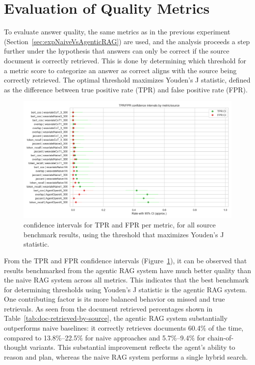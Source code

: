 \section{Evaluation of Quality Metrics}
\label{sec:metric-evaluation-quality}
To evaluate answer quality, the same metrics as in the previous experiment (Section~\ref{sec:expNaiveVsAgenticRAG}) are used, and the analysis proceeds a step further under the hypothesis that answers can only be correct if the source document is correctly retrieved. This is done by determining which threshold for a metric score to categorize an answer as correct aligns with the source being correctly retrieved. The optimal threshold maximizes Youden's J statistic, defined as the difference between true positive rate (TPR) and false positive rate (FPR).
\begin{figure}[H]
    \centering
    \includegraphics[width=1\linewidth]{Figures/06_tpr_fpr_confidence_intervals.png}
    \caption{confidence intervals for TPR and FPR per metric, for all source benchmark results, using the threshold that maximizes Youden's J statistic.}\label{fig:confidence-intervals}
\end{figure}

From the TPR and FPR confidence intervals (Figure~\ref{fig:confidence-intervals}), it can be observed that results benchmarked from the agentic RAG system have much better quality than the naive RAG system across all metrics. This indicates that the best benchmark for determining thresholds using Youden's J statistic is the agentic RAG system. One contributing factor is its more balanced behavior on missed and true retrievals. As seen from the document retrieved percentages shown in Table~\ref{tab:doc-retrieved-by-source}, the agentic RAG system substantially outperforms naive baselines: it correctly retrieves documents 60.4\% of the time, compared to 13.8\%–22.5\% for naive approaches and 5.7\%–9.4\% for chain-of-thought variants. This substantial improvement reflects the agent's ability to reason and plan, whereas the naive RAG system performs a single hybrid search.

